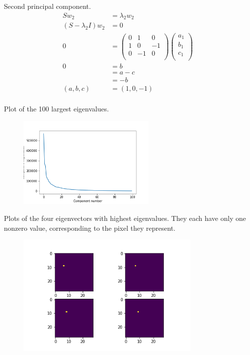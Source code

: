 \documentclass[newpage]{homework}
\begin{document}
Second principal component.
\begin{align*}
    Sw_2	&=	\lambda_2 w_2	\\
    (S - \lambda_2 I) w_2 &=  0   \\
    0   &=  \begin{pmatrix}
            0 & 1 & 0   \\
            1 & 0 & -1  \\
            0 & -1 & 0  \\
            \end{pmatrix}
            \begin{pmatrix}
            a_1    \\
            b_1    \\
            c_1    \\
            \end{pmatrix}   \\
    0   &=  b \\
        &=  a - c  \\
        &=  -b \\
    (a, b, c)   &=  \boxed{(1, 0, -1)}   \\
\end{align*}


\question

Plot of the 100 largest eigenvalues.
\begin{figure}[htbp]
    \centering
    \includegraphics[width=0.6\textwidth]{3a.png}
\end{figure}

Plots of the four eigenvectors with highest eigenvalues. They each have only one nonzero value, corresponding to the pixel they represent.
\begin{figure}[htbp]
    \centering
    \includegraphics[width=0.8\textwidth]{3b.png}
\end{figure}
\end{document}
